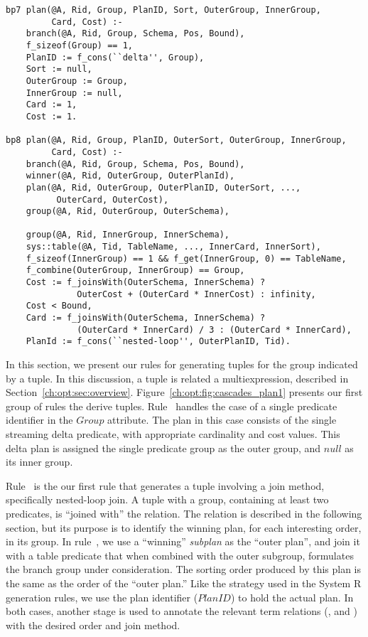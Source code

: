 \begin{figure*}
\ssp
\centering
\begin{lstlisting}
bp7 plan(@A, Rid, Group, PlanID, Sort, OuterGroup, InnerGroup, 
         Card, Cost) :-
    branch(@A, Rid, Group, Schema, Pos, Bound),
    f_sizeof(Group) == 1,
    PlanID := f_cons(``delta'', Group),
    Sort := null,
    OuterGroup := Group,
    InnerGroup := null,
    Card := 1,
    Cost := 1.

bp8 plan(@A, Rid, Group, PlanID, OuterSort, OuterGroup, InnerGroup, 
         Card, Cost) :-
    branch(@A, Rid, Group, Schema, Pos, Bound),
    winner(@A, Rid, OuterGroup, OuterPlanId),
    plan(@A, Rid, OuterGroup, OuterPlanID, OuterSort, ..., 
          OuterCard, OuterCost),
    group(@A, Rid, OuterGroup, OuterSchema),

    group(@A, Rid, InnerGroup, InnerSchema),
    sys::table(@A, Tid, TableName, ..., InnerCard, InnerSort),
    f_sizeof(InnerGroup) == 1 && f_get(InnerGroup, 0) == TableName,
    f_combine(OuterGroup, InnerGroup) == Group,
    Cost := f_joinsWith(OuterSchema, InnerSchema) ?
              OuterCost + (OuterCard * InnerCost) : infinity,
    Cost < Bound,
    Card := f_joinsWith(OuterSchema, InnerSchema) ?
              (OuterCard * InnerCard) / 3 : (OuterCard * InnerCard),
    PlanId := f_cons(``nested-loop'', OuterPlanID, Tid).
\end{lstlisting}
\caption{\label{ch:opt:fig:cascades_plan1} Cascades plan generation rules for event
predicates and nested-loop join method.}
\end{figure*}

In this section, we present our rules for generating  tuples for the
group indicated by a  tuple.  In this discussion, a  tuple
is related a multiexpression, described in Section~\ref{ch:opt:sec:overview}.
Figure~\ref{ch:opt:fig:cascades_plan1} presents our first group of rules the
derive  tuples.  Rule~ handles the case of a single predicate
identifier in the $Group$ attribute.  The plan in this case consists of the
single streaming delta predicate, with appropriate cardinality and cost values.
This delta plan is assigned the single predicate group as the outer group, and
$null$ as its inner group.

Rule~ is the our first rule that generates a  tuple involving
a join method, specifically nested-loop join.  A  tuple with a
group, containing at least two predicates, is ``joined with'' the 
relation.  The  relation is described in the following section, but
its purpose is to identify the winning plan, for each interesting order, in its
group.  In rule~, we use a ``winning'' {\em subplan} as the ``outer
plan'', and join it with a table predicate that when combined with the outer
subgroup, formulates the branch group under consideration.  The sorting order
produced by this plan is the same as the order of the ``outer plan.'' Like the
strategy used in the System R  generation rules, we use the plan
identifier ($PlanID$) to hold the actual plan.  In both cases, another stage is
used to annotate the relevant term relations (,
 and ) with the desired order and join method.

